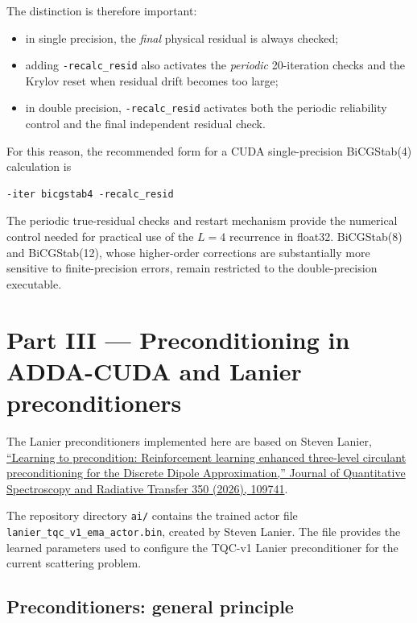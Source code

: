 \documentclass[11pt,a4paper]{article}
\begin{document}
The distinction is therefore important:
\begin{itemize}[leftmargin=1.6em]
\item in single precision, the \emph{final} physical residual is always checked;
\item adding \texttt{-recalc\_resid} also activates the \emph{periodic} 20-iteration checks and the Krylov reset when residual drift becomes too large;
\item in double precision, \texttt{-recalc\_resid} activates both the periodic reliability control and the final independent residual check.
\end{itemize}

For this reason, the recommended form for a CUDA single-precision BiCGStab(4) calculation is
\begin{verbatim}
-iter bicgstab4 -recalc_resid
\end{verbatim}
The periodic true-residual checks and restart mechanism provide the numerical control needed for practical use of the \(L=4\) recurrence in float32. BiCGStab(8) and BiCGStab(12), whose higher-order corrections are substantially more sensitive to finite-precision errors, remain restricted to the double-precision executable.

\section{Part III --- Preconditioning in ADDA-CUDA and Lanier preconditioners}

The Lanier preconditioners implemented here are based on Steven Lanier,
\href{https://doi.org/10.1016/j.jqsrt.2025.109741}{``Learning to precondition:
Reinforcement learning enhanced three-level circulant preconditioning for the
Discrete Dipole Approximation,'' Journal of Quantitative Spectroscopy and
Radiative Transfer 350 (2026), 109741}.

The repository directory \texttt{ai/} contains the trained actor file
\texttt{lanier\_tqc\_v1\_ema\_actor.bin}, created by Steven Lanier. The file
provides the learned parameters used to configure the TQC-v1 Lanier
preconditioner for the current scattering problem.

\subsection{Preconditioners: general principle}
\end{document}
